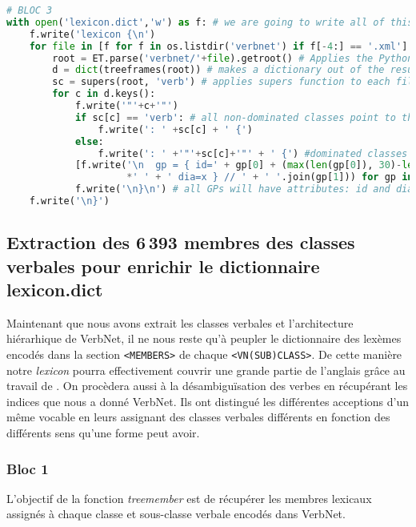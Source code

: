 \begin{lstlisting}[language=Python, caption = Importation de l'architecture des classes verbales, label=fig:archivn]
# BLOC 3
with open('lexicon.dict','w') as f: # we are going to write all of this block into lexicon.dict
    f.write('lexicon {\n')
    for file in [f for f in os.listdir('verbnet') if f[-4:] == '.xml']: # open VerbNet XMl files
        root = ET.parse('verbnet/'+file).getroot() # Applies the Python Element Tree module
        d = dict(treeframes(root)) # makes a dictionary out of the results of treeframes on a file
        sc = supers(root, 'verb') # applies supers function to each file
        for c in d.keys():
            f.write('"'+c+'"')
            if sc[c] == 'verb': # all non-dominated classes point to the default verb class
                f.write(': ' +sc[c] + ' {') 
            else:
                f.write(': ' +'"'+sc[c]+'"' + ' {') #dominated classes point towards their governor
            [f.write('\n  gp = { id=' + gp[0] + (max(len(gp[0]), 30)-len(gp[0]))
                     *' ' + ' dia=x } // ' + ' '.join(gp[1])) for gp in d[c]]
            f.write('\n}\n') # all GPs will have attributes: id and dia
    f.write('\n}')
\end{lstlisting}

\subsection{Extraction des 6\,393 membres des classes verbales pour enrichir le dictionnaire lexicon.dict} \label{extracmembre}

Maintenant que nous avons extrait les classes verbales et l'architecture hiérarhique de VerbNet, il ne nous reste qu'à peupler le dictionnaire des lexèmes encodés dans la section \texttt{<MEMBERS>} de chaque \texttt{<VN(SUB)CLASS>}. De cette manière notre \emph{lexicon} pourra effectivement couvrir une grande partie de l'anglais grâce au travail de \cite{SchulerVerbnetBroadcoverageComprehensive2005}. On procèdera aussi à la désambiguïsation des verbes en récupérant les indices que nous a donné VerbNet. Ils ont distingué les différentes acceptions d'un même vocable en leurs assignant des classes verbales différents en fonction des différents sens qu'une forme peut avoir.

\subsubsection{Bloc 1}
L'objectif de la fonction \emph{treemember} est de récupérer les membres lexicaux assignés à chaque classe et sous-classe verbale encodés dans VerbNet.

